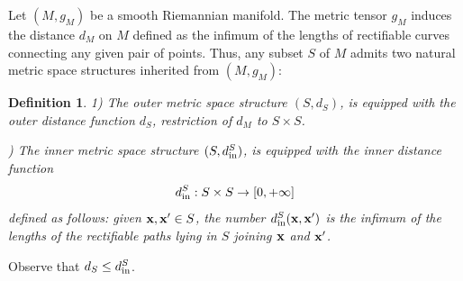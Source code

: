 \documentclass[11pt]{amsart}
\newtheorem{definition}[theorem]{Definition}
\newcommand{\bx}{{\bf x}}
\newcommand{\inn}{{{\rm in}}}
\numberwithin{equation}{section}
\numberwithin{equation}{section}
\begin{document}
Let $(M,g_M)$ be a smooth Riemannian manifold. The metric 
tensor $g_M$ induces the 
distance $d_M$ on $M$ defined as the infimum of the lengths of rectifiable 
curves connecting any given pair of points. 
Thus, any subset $S$ of $M$ admits two natural metric space structures 
inherited from $(M,g_M)$:
%
%
\begin{definition}\label{def:outer-inner}
	1) The \em outer metric space structure $(S,d_S)$, \em is equipped with 
	the \em outer distance \em function $d_S$, 
	restriction of $d_M$ to $S\times S$. 
	
	\smallskip{}) The \em inner metric space structure $(S,d_\inn^S)$, \em is equipped with
	the \em inner distance \em function 
	$$
	d_\inn^S: S\times S \to [0,+\infty]
	$$
	defined as follows: given $\bx,\bx'\in S$, the number $d_\inn^S(\bx,\bx')$ is the infimum of the lengths
	of the rectifiable paths lying in $S$ joining $\bx$ and $\bx'$.   
\end{definition}
%
%
Observe that $d_S \leq d_\inn^S$. 
\end{document}
